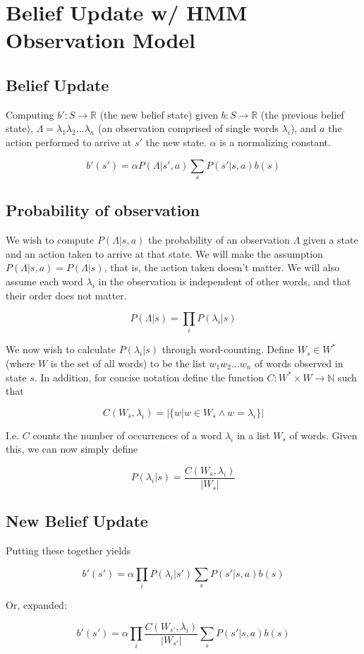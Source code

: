 \documentclass{article}
\begin{document}
\section{Belief Update w/ HMM Observation Model}

\subsection{Belief Update}
Computing $b' : S \rightarrow \mathbb{R}$ (the new belief state) given $b : S \rightarrow \mathbb{R}$ (the previous belief state), $\Lambda = \lambda_1\lambda_2...\lambda_n$ (an observation comprised of single words $\lambda_i$), and $a$ the action performed to arrive at $s'$ the new state. $\alpha$ is a normalizing constant.

$$
b'(s') = \alpha{}P(\Lambda | s', a)\sum_sP(s' | s, a)b(s)
$$

\subsection{Probability of observation}
We wish to compute $P(\Lambda | s, a)$ the probability of an observation $\Lambda$ given a state and an action taken to arrive at that state.  We will make the assumption $P(\Lambda | s, a) = P(\Lambda | s)$, that is, the action taken doesn't matter.  We will also assume each word $\lambda_i$ in the observation is independent of other words, and that their order does not matter.

$$
P(\Lambda | s) = \prod_iP(\lambda_i|s)
$$

We now wish to calculate $P(\lambda_i|s)$ through word-counting. Define $W_s \in W^*$ (where $W$ is the set of all words) to be the list $w_1w_2...w_n$ of words observed in state $s$.  In addition, for concise notation define the function $C : W^* \times W \rightarrow \mathbb{N}$ such that 

$$
C(W_s, \lambda_i) = |\{w|w \in W_s \land w = \lambda_i\}|
$$

I.e. $C$ counts the number of occurrences of a word $\lambda_i$ in a list $W_s$ of words.  Given this, we can now simply define

$$
P(\lambda_i|s) = \frac{C(W_s, \lambda_i)}{|W_s|}
$$

\subsection{New Belief Update}
Putting these together yields

$$
b'(s') = \alpha{}\prod_iP(\lambda_i|s')\sum_sP(s' | s, a)b(s)
$$

Or, expanded:

$$
b'(s') = \alpha{}\prod_i\frac{C(W_{s'}, \lambda_i)}{|W_{s'}|}\sum_sP(s' | s, a)b(s)
$$
\end{document}
